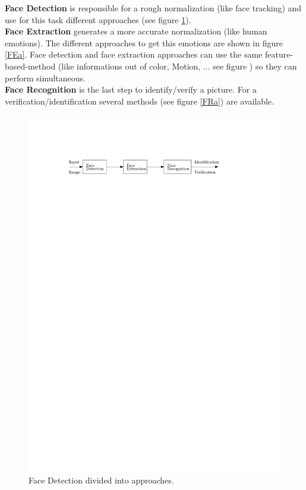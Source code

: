 \documentclass[Bachelorarbeit.tex]{subfiles}
\begin{document}
\textbf{Face Detection} is responsible for a rough normalization (like face tracking) and use for this task different approaches (see figure \ref{FDa}).\\
\textbf{Face Extraction} generates a more accurate normalization (like human emotions). The different approaches to get this emotions are shown in figure \ref{FEa}. Face detection and face extraction approaches can use the same feature-based-method (like informations out of color, Motion, ... see figure \label{FDaSurvey}) so they can perform simultaneous. \\
\textbf{Face Recognition} is the last step to identify/verify a picture. For a verification/identification several methods (see figure \ref{FRa}) are available.\\


\begin{figure}[!h] %
\centering
\includegraphics[page=3,scale=1]{./pictures/drawings}
\caption{Face Detection divided into approaches. \label{FDa}}
\end{figure}
\end{document}
